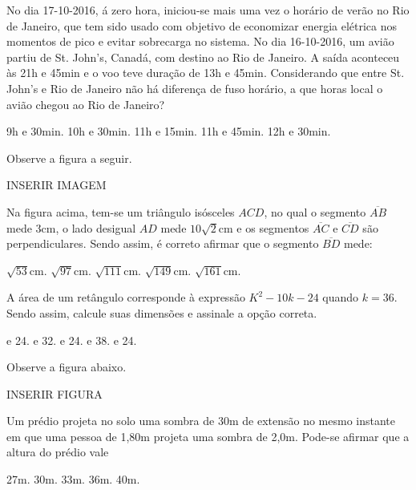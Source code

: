 \begin{question}%
No dia 17-10-2016, á zero hora, iniciou-se mais uma vez o horário de verão no Rio de Janeiro, que tem sido usado com objetivo de economizar energia elétrica nos momentos de pico e evitar sobrecarga no sistema. No dia 16-10-2016, um avião partiu de St. John's, Canadá, com destino ao Rio de Janeiro. A saída aconteceu às 21h e 45min e o voo teve duração de 13h e 45min. Considerando que entre St. John's e Rio de Janeiro não há diferença de fuso horário, a que horas local o avião chegou ao Rio de Janeiro?
    \begin{tasks}
        \task 9h e 30min.
        \task 10h e 30min.
        \task 11h e 15min.
        \task 11h e 45min.
        \task 12h e 30min.
    \end{tasks}
\end{question}

\begin{question}%
Observe a figura a seguir.

INSERIR IMAGEM

Na figura acima, tem-se um triângulo isósceles \(ACD\), no qual o segmento \(\overline{AB}\) mede 3cm, o lado desigual \(AD\) mede \(10\sqrt{2}\)cm e os segmentos \(\overline{AC}\) e \(\overline{CD}\) são perpendiculares. Sendo assim, é correto afirmar que o segmento \(\overline{BD}\) mede:
    \begin{tasks}
        \task \(\sqrt{53}\)cm.
        \task \(\sqrt{97}\)cm.
        \task \(\sqrt{111}\)cm.
        \task \(\sqrt{149}\)cm.
        \task \(\sqrt{161}\)cm.
    \end{tasks}
\end{question}

\begin{question}%
A área de um retângulo corresponde à expressão \(K^2-10k-24\) quando \(k=36\). Sendo assim, calcule suas dimensões e assinale a opção correta.
    \begin{tasks}
         e 24.
         e 32.
         e 24.
         e 38.
         e 24.
    \end{tasks}
\end{question}

\begin{question}%
Observe a figura abaixo.

INSERIR FIGURA

Um prédio projeta no solo uma sombra de 30m de extensão no mesmo instante em que uma pessoa de 1,80m projeta uma sombra de 2,0m. Pode-se afirmar que a altura do prédio vale
    \begin{tasks}
        \task 27m.
        \task 30m.
        \task 33m.
        \task 36m.
        \task 40m.
    \end{tasks}
\end{question}